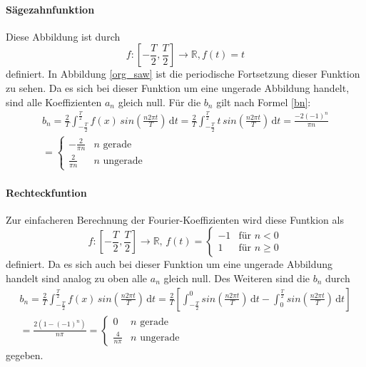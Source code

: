 \documentclass[11pt,ngerman,a4paper]{article}
\begin{document}
\paragraph{S\"agezahnfunktion} Diese Abbildung ist durch
\begin{equation}
f \colon  \left[-\frac{T}{2}, \frac{T}{2}\right]\to \mathbb{R}, f(t) = t
\end{equation}
definiert. In Abbildung \ref{org_saw} ist die periodische Fortsetzung dieser Funktion zu sehen. Da es sich bei dieser Funktion um eine ungerade Abbildung handelt, sind alle Koeffizienten $a_n$ gleich null. F\"ur die $b_n$ gilt nach Formel \ref{bn}:
\begin{align}
b_n = \frac 2 T\int_{-\frac T 2}^\frac T 2\!f(x)\,sin\left(\frac{n2\pi t}{T}\right)\,\mathrm dt = \frac 2 T \int_{-\frac T 2}^\frac T 2\!t\,sin\left(\frac{n2\pi t}{T}\right)\,\mathrm dt =\frac{ -2(-1)^n}{\pi n}\\=
\begin{cases}
-\frac{2}{\pi n} & n \mbox{ gerade}  \\
\frac{2}{\pi n} & n \mbox{ ungerade}
\end{cases}
\end{align}
\paragraph{Rechteckfuntion} Zur einfacheren Berechnung der Fourier-Koeffizienten wird diese Funtkion als
\begin{equation}
f \colon  \left[-\frac{T}{2}, \frac{T}{2}\right]\to \mathbb{R},\,f(t) = \begin{cases}
-1 & \mbox{f\"ur } n < 0 \\
1  & \mbox{f\"ur } n \geq 0
\end{cases}
\end{equation}
definiert. Da es sich auch bei dieser Funktion um eine ungerade Abbildung handelt sind analog zu oben alle $a_n$ gleich null. Des Weiteren sind die $b_n$ durch
\begin{align}
b_n = \frac 2 T\int_{-\frac T 2}^\frac T 2\!f(x)\,sin\left(\frac{n2\pi t}{T}\right)\,\mathrm dt = \frac 2 T \left[ \int_{-\frac T 2}^0\!sin\left(\frac{n2\pi t}{T}\right)\,\mathrm dt - \int_0^{\frac T 2}\!sin\left(\frac{n2\pi t}{T}\right)\,\mathrm dt \right] \\
= \frac{2 (1- (-1)^n)}{n \pi} =
\begin{cases}
0 & n \mbox{ gerade}\\
\frac4{n\pi} & n \mbox{ ungerade}
\end{cases} 
\end{align}
gegeben.
\end{document}
